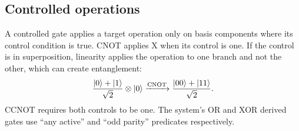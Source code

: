 \subsection{Controlled operations}

A controlled gate applies a target operation only on basis components where
its control condition is true. CNOT applies X when its control is one. If the
control is in superposition, linearity applies the operation to one branch and
not the other, which can create entanglement:
\[
\frac{\lvert 0\rangle+\lvert 1\rangle}{\sqrt2}\otimes\lvert 0\rangle
\xrightarrow{\mathrm{CNOT}}
\frac{\lvert 00\rangle+\lvert 11\rangle}{\sqrt2}.
\]
CCNOT requires both controls to be one. The system's OR and XOR derived gates
use ``any active'' and ``odd parity'' predicates respectively.


